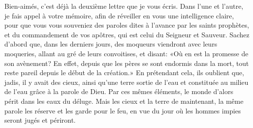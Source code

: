 Bien-aimés, c’est déjà la deuxième lettre que je vous écris.
Dans l’une et l’autre, je fais appel à votre mémoire,
	afin de réveiller en vous une intelligence claire,
	pour que vous vous souveniez des paroles dites à l’avance par les saints prophètes,
	et du commandement de vos apôtres, qui est celui du Seigneur et Sauveur.
Sachez d’abord que, dans les derniers jours,
	des moqueurs viendront avec leurs moqueries,
	allant au gré de leurs convoitises, et disant:
	«Où en est la promesse de son avènement?
	En effet, depuis que les pères se sont endormis dans la mort,
	tout reste pareil depuis le début de la création.»
En prétendant cela, ils oublient que, jadis, il y avait des cieux,
	ainsi qu’une terre sortie de l’eau
	et constituée au milieu de l’eau grâce à la parole de Dieu.
Par ces mêmes éléments, le monde d’alors périt dans les eaux du déluge.
Mais les cieux et la terre de maintenant,
	la même parole les réserve et les garde pour le feu,
	en vue du jour où les hommes impies seront jugés et périront.
